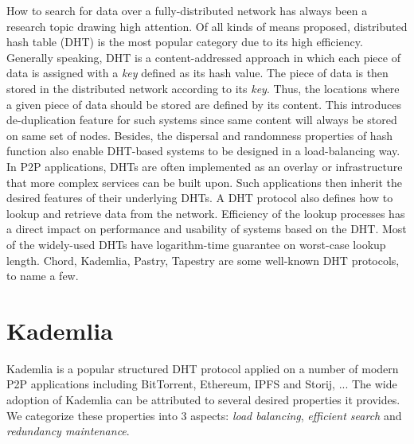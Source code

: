 How to search for data over a fully-distributed network has always been a research topic drawing high attention. Of all kinds of means proposed, distributed hash table (DHT) is the most popular category due to its high efficiency. Generally speaking, DHT is a content-addressed approach in which each piece of data is assigned with a \textit{key} defined as its hash value. The piece of data is then stored in the distributed network according to its \textit{key}. Thus, the locations where a given piece of data should be stored are defined by its content. This introduces de-duplication feature for such systems since same content will always be stored on same set of nodes. Besides, the dispersal and randomness properties of hash function also enable DHT-based systems to be designed in a load-balancing way. In P2P applications, DHTs are often implemented as an overlay or infrastructure that more complex services can be built upon. Such applications then inherit the desired features of their underlying DHTs. A DHT protocol also defines how to lookup and retrieve data from the network. Efficiency of the lookup processes has a direct impact on performance and usability of systems based on the DHT. Most of the widely-used DHTs have logarithm-time guarantee on worst-case lookup length. Chord\cite{stoica2001chord}, Kademlia\cite{maymounkov2002kademlia}, Pastry\cite{rowstron2001pastry}, Tapestry\cite{zhao2004tapestry} are some well-known DHT protocols, to name a few.

\section{Kademlia}
\label{s:kademlia}
Kademlia\cite{maymounkov2002kademlia} is a popular structured DHT protocol applied on a number of modern P2P applications including BitTorrent\cite{bittorrent}, Ethereum\cite{ethereum}, IPFS\cite{ipfs} and Storij\cite{storij}, ... The wide adoption of Kademlia can be attributed to several desired properties it provides. We categorize these properties into 3 aspects: \textit{load balancing}, \textit{efficient search} and \textit{redundancy maintenance}.


